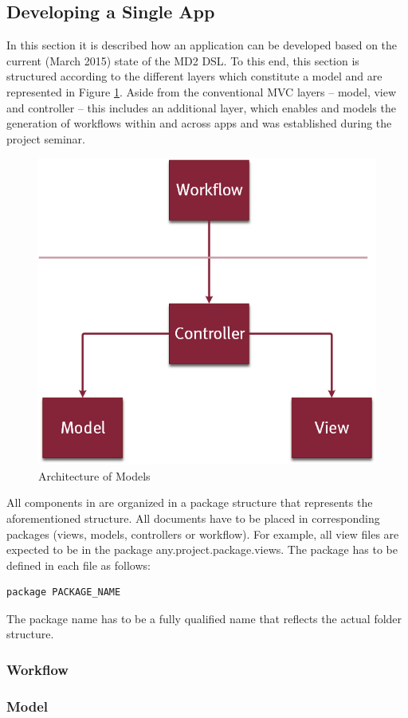 
\subsection{Developing a Single App} 
\label{subsec:SingleAppDev}
In this section it is described how an application can be developed based on the current (March 2015) state of the MD2 DSL. To this end, this section is structured according to the different layers which constitute a \MD model and are represented in Figure \ref{fig:MD2Arch}. Aside from the conventional MVC layers -- model, view and controller -- this includes an additional layer, which enables and models the generation of workflows within and across apps and was established during the project seminar.

\begin{figure}[htb!]
\centering
\includegraphics[width = 0.4\linewidth]{Fig/MD2Arch.png}
\caption{Architecture of \MD Models}
\label{fig:MD2Arch}
\end{figure}

All components in \MD are organized in a package structure that represents the aforementioned structure. All documents have to be placed in corresponding packages (views, models, controllers or workflow). For example, all view files are expected to be in the package any.project.package.views. The package has to be defined in each \MD file as follows:
\begin{lstlisting}
package PACKAGE_NAME
\end{lstlisting}
The package name has to be a fully qualified name that reflects the actual folder structure.

\subsubsection{Workflow} 
\label{subsubsec:Workflow}


\subsubsection{Model} 
\label{subsubsec:Model}


